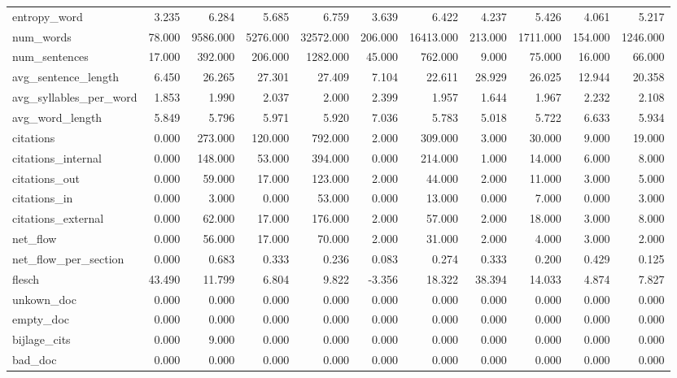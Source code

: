 \begin{tabular}{lrrrrrrrrrr}
\cline{1-11}
entropy\_word & 3.235 & 6.284 & 5.685 & 6.759 & 3.639 & 6.422 & 4.237 & 5.426 & 4.061 & 5.217 \\
\cline{1-11}
num\_words & 78.000 & 9586.000 & 5276.000 & 32572.000 & 206.000 & 16413.000 & 213.000 & 1711.000 & 154.000 & 1246.000 \\
\cline{1-11}
num\_sentences & 17.000 & 392.000 & 206.000 & 1282.000 & 45.000 & 762.000 & 9.000 & 75.000 & 16.000 & 66.000 \\
\cline{1-11}
avg\_sentence\_length & 6.450 & 26.265 & 27.301 & 27.409 & 7.104 & 22.611 & 28.929 & 26.025 & 12.944 & 20.358 \\
\cline{1-11}
avg\_syllables\_per\_word & 1.853 & 1.990 & 2.037 & 2.000 & 2.399 & 1.957 & 1.644 & 1.967 & 2.232 & 2.108 \\
\cline{1-11}
avg\_word\_length & 5.849 & 5.796 & 5.971 & 5.920 & 7.036 & 5.783 & 5.018 & 5.722 & 6.633 & 5.934 \\
\cline{1-11}
citations & 0.000 & 273.000 & 120.000 & 792.000 & 2.000 & 309.000 & 3.000 & 30.000 & 9.000 & 19.000 \\
\cline{1-11}
citations\_internal & 0.000 & 148.000 & 53.000 & 394.000 & 0.000 & 214.000 & 1.000 & 14.000 & 6.000 & 8.000 \\
\cline{1-11}
citations\_out & 0.000 & 59.000 & 17.000 & 123.000 & 2.000 & 44.000 & 2.000 & 11.000 & 3.000 & 5.000 \\
\cline{1-11}
citations\_in & 0.000 & 3.000 & 0.000 & 53.000 & 0.000 & 13.000 & 0.000 & 7.000 & 0.000 & 3.000 \\
\cline{1-11}
citations\_external & 0.000 & 62.000 & 17.000 & 176.000 & 2.000 & 57.000 & 2.000 & 18.000 & 3.000 & 8.000 \\
\cline{1-11}
net\_flow & 0.000 & 56.000 & 17.000 & 70.000 & 2.000 & 31.000 & 2.000 & 4.000 & 3.000 & 2.000 \\
\cline{1-11}
net\_flow\_per\_section & 0.000 & 0.683 & 0.333 & 0.236 & 0.083 & 0.274 & 0.333 & 0.200 & 0.429 & 0.125 \\
\cline{1-11}
flesch & 43.490 & 11.799 & 6.804 & 9.822 & -3.356 & 18.322 & 38.394 & 14.033 & 4.874 & 7.827 \\
\cline{1-11}
unkown\_doc & 0.000 & 0.000 & 0.000 & 0.000 & 0.000 & 0.000 & 0.000 & 0.000 & 0.000 & 0.000 \\
\cline{1-11}
empty\_doc & 0.000 & 0.000 & 0.000 & 0.000 & 0.000 & 0.000 & 0.000 & 0.000 & 0.000 & 0.000 \\
\cline{1-11}
bijlage\_cits & 0.000 & 9.000 & 0.000 & 0.000 & 0.000 & 0.000 & 0.000 & 0.000 & 0.000 & 0.000 \\
\cline{1-11}
bad\_doc & 0.000 & 0.000 & 0.000 & 0.000 & 0.000 & 0.000 & 0.000 & 0.000 & 0.000 & 0.000 \\
\cline{1-11}
\bottomrule
\end{tabular}
